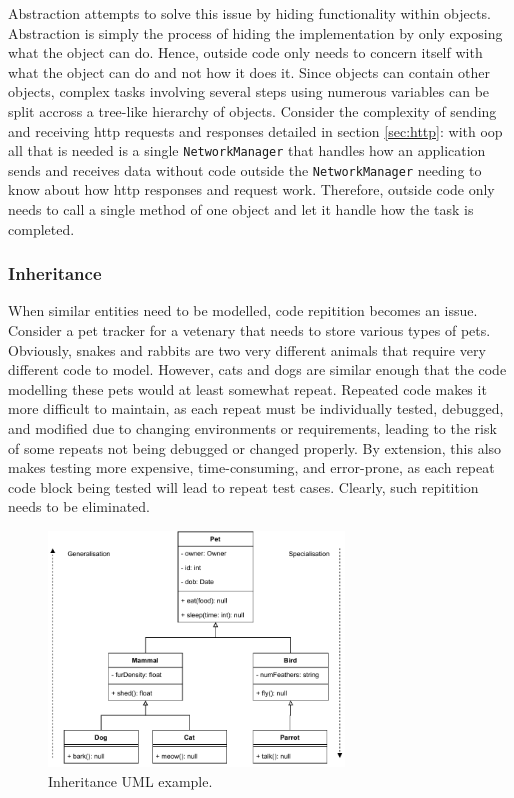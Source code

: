 \documentclass[11pt]{article}
\begin{document}
Abstraction attempts to solve this issue by hiding functionality within \glspl{object}. Abstraction is simply the process of hiding the implementation by only exposing what the \gls{object} can do. Hence, outside code only needs to concern itself with what the \gls{object} can do and not how it does it. Since \glspl{object} can contain other \glspl{object}, complex tasks involving several steps using numerous variables can be split accross a tree-like hierarchy of \glspl{object}. Consider the complexity of sending and receiving \acrshort{http} \gls{request}s and \gls{response}s detailed in section \ref{sec:http}: with \acrshort{oop} all that is needed is a single \texttt{NetworkManager} that handles how an application sends and receives data without code outside the \texttt{NetworkManager} needing to know about how \acrshort{http} \gls{response}s and \gls{request} work. Therefore, outside code only needs to call a single method of one \gls{object} and let it handle how the task is completed.

\subsubsection{Inheritance}

When similar entities need to be modelled, code repitition becomes an issue. Consider a pet tracker for a vetenary that needs to store various types of pets. Obviously, snakes and rabbits are two very different animals that require very different code to model. However, cats and dogs are similar enough that the code modelling these pets would at least somewhat repeat. Repeated code makes it more difficult to maintain, as each repeat must be individually tested, debugged, and modified due to changing environments or requirements, leading to the risk of some repeats not being debugged or changed properly. By extension, this also makes testing more expensive, time-consuming, and error-prone, as each repeat code block being tested will lead to repeat test cases. Clearly, such repitition needs to be eliminated.

\begin{figure}[b!]
    \centering
    \includegraphics[width=0.7\textwidth]{figures/inheritance.pdf}
    \caption{Inheritance UML example.}
    \label{fig:inheritance-uml}
\end{figure}
\end{document}
